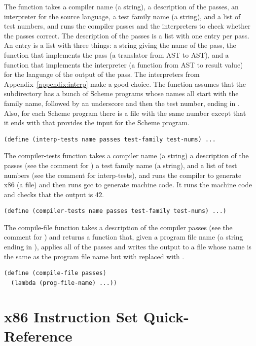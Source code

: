 \documentclass[11pt]{book}
\begin{document}
The  function takes a compiler name (a string), a
description of the passes, an interpreter for the source language, a
test family name (a string), and a list of test numbers, and runs the
compiler passes and the interpreters to check whether the passes
correct. The description of the passes is a list with one entry per
pass.  An entry is a list with three things: a string giving the name
of the pass, the function that implements the pass (a translator from
AST to AST), and a function that implements the interpreter (a
function from AST to result value) for the language of the output of
the pass.  The interpreters from Appendix~\ref{appendix:interp} make a
good choice.  The  function assumes that the
subdirectory  has a bunch of Scheme programs whose names
all start with the family name, followed by an underscore and then the
test number, ending in . Also, for each Scheme program there
is a file with the same number except that it ends with  that
provides the input for the Scheme program.
\begin{lstlisting}
(define (interp-tests name passes test-family test-nums) ...
\end{lstlisting}

The compiler-tests function takes a compiler name (a string) a
description of the passes (see the comment for ) a
test family name (a string), and a list of test numbers (see the
comment for interp-tests), and runs the compiler to generate x86 (a
 file) and then runs gcc to generate machine code.  It runs
the machine code and checks that the output is 42.
\begin{lstlisting}
(define (compiler-tests name passes test-family test-nums) ...)
\end{lstlisting}

The compile-file function takes a description of the compiler passes
(see the comment for ) and returns a function that,
given a program file name (a string ending in ), applies all
of the passes and writes the output to a file whose name is the same
as the program file name but with  replaced with .
\begin{lstlisting}
(define (compile-file passes)
  (lambda (prog-file-name) ...))
\end{lstlisting}

\section{x86 Instruction Set Quick-Reference}
\label{sec:x86-quick-reference}
\end{document}
